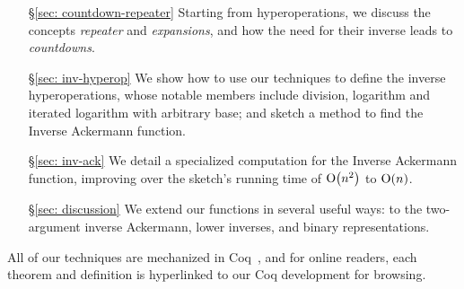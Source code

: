 \begin{itemize}
	\item[\S\ref{sec: countdown-repeater}] Starting from hyperoperations, we discuss the concepts \emph{repeater} and \emph{expansions}, and how the need for their inverse leads to \emph{countdowns}.
	\item[\S\ref{sec: inv-hyperop}] We show how to use our techniques to define the inverse hyperoperations, whose notable members include division, logarithm and iterated logarithm with arbitrary base; and sketch a method to find the Inverse Ackermann function.
	\item[\S\ref{sec: inv-ack}] We detail a specialized computation for the Inverse Ackermann function, improving over the sketch's running time of $\text{O}\big(n^2\big)$ to $\text{O}(n)$.
	\item[\S\ref{sec: discussion}] We extend our functions in several useful ways: to the two-argument inverse Ackermann, lower inverses, and binary representations.
\end{itemize}
All of our techniques are mechanized in Coq~\cite{blah}, and for online readers,
each theorem and definition is hyperlinked to our Coq development for browsing.

